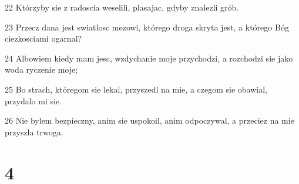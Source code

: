 \par 22 Którzyby sie z radoscia weselili, plasajac, gdyby znalezli grób.
\par 23 Przecz dana jest swiatlosc mezowi, którego droga skryta jest, a którego Bóg ciezkosciami ogarnal?
\par 24 Albowiem kiedy mam jesc, wzdychanie moje przychodzi, a rozchodzi sie jako woda ryczenie moje;
\par 25 Bo strach, któregom sie lekal, przyszedl na mie, a czegom sie obawial, przydalo mi sie.
\par 26 Nie bylem bezpieczny, anim sie uspokoil, anim odpoczywal, a przeciez na mie przyszla trwoga.

\chapter{4}

